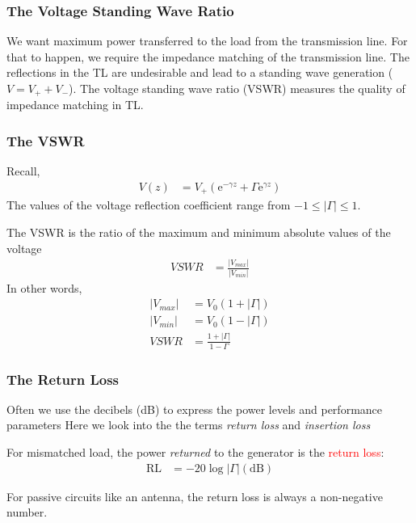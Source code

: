 \documentclass[10pt, compress]{beamer}
\newcommand{\e}{\mathrm{e}} %
\begin{document}
\begin{frame}
  \frametitle{The Voltage Standing Wave Ratio}
\begin{outline}
  \1 We want maximum power transferred to the load from the transmission line.
  \2 For that to happen, we require the impedance matching of the transmission line.
  \1 The reflections in the TL are undesirable and lead to a standing wave generation ($V = V_{+} + V_{-}$).
  \1 The voltage standing wave ratio (VSWR) measures the quality of impedance matching in TL.
\end{outline}
\end{frame}

\begin{frame}
  \frametitle{The VSWR}

  Recall, 
  \begin{align*}
    V(z) &= V_{+} \left( \e^{- \gamma z} + \Gamma \e^{ \gamma z} \right)
  \end{align*}
  The values of the voltage reflection coefficient range from $-1 \le |\Gamma| \le 1$.

  The VSWR is the ratio of the maximum and minimum absolute values of the voltage
  \begin{align*}
    VSWR &= \frac{|V_{max}|}{|V_{min}|}
  \end{align*}
  In other words,
  \begin{align*}
    |V_{max}| &= V_0 \left(1 + |\Gamma|\right) \\
    |V_{min}| &= V_0 \left(1 - |\Gamma|\right) \\  
    VSWR &= \frac{1 + |\Gamma|}{1 - \Gamma}
  \end{align*}
\end{frame}

\begin{frame}
  \frametitle{The Return Loss}

  \begin{outline}
    \1 Often we use the decibels (dB) to express the power levels and performance parameters
    \1 Here we look into the the terms \textit{return loss} and \textit{insertion loss}
  \end{outline}
  For mismatched load, the power \textit{returned} to the generator is the \textcolor{red}{return loss}:
  \begin{align*}
  \mathrm{RL} &= -20 \log |\Gamma| \mathrm{(dB)}
  \end{align*} 
  \begin{outline}
    \1 For passive circuits like an antenna, the return loss is always a non-negative number.
  \end{outline}


\end{frame}
\end{document}
